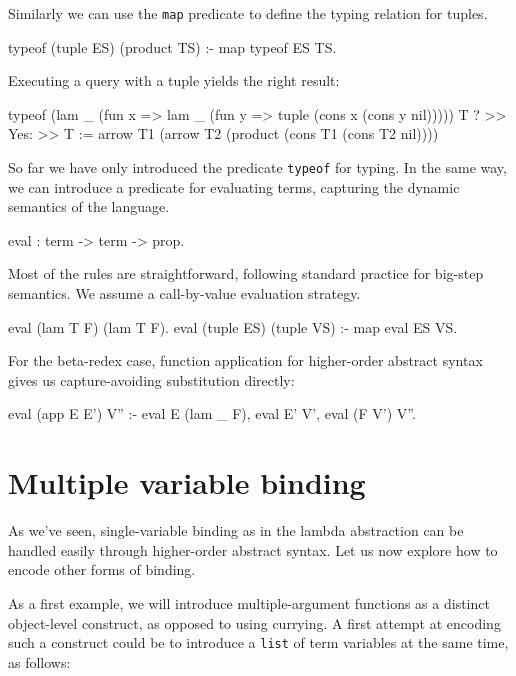 \documentclass[format=acmlarge,review,anonymous]{acmart}\settopmatter{printfolios=true}
\begin{document}
Similarly we can use the \texttt{map} predicate to define the typing relation for tuples. 

\begin{codequote}
typeof (tuple ES) (product TS) :-
  map typeof ES TS.
\end{codequote}

Executing a query with a tuple yields the right result:

\begin{codequote}
typeof (lam _ (fun x => lam _ (fun y => tuple (cons x (cons y nil))))) T ?
>> Yes:
>> T := arrow T1 (arrow T2 (product (cons T1 (cons T2 nil))))
\end{codequote}

So far we have only introduced the predicate \texttt{typeof} for typing. In the same way, we can introduce
a predicate for evaluating terms, capturing the dynamic semantics of the language.

\begin{codequote}
eval : term -> term -> prop.
\end{codequote}

Most of the rules are straightforward, following standard practice for big-step semantics.  We
assume a call-by-value evaluation strategy.

\begin{codequote}
eval (lam T F) (lam T F).
eval (tuple ES) (tuple VS) :- map eval ES VS.
\end{codequote}

For the beta-redex case, function application for higher-order abstract syntax gives us
capture-avoiding substitution directly:

\begin{codequote}
eval (app E E') V'' :-
  eval E (lam _ F), eval E' V', eval (F V') V''.
\end{codequote}


\section{Multiple variable binding}

As we've seen, single-variable binding as in the lambda abstraction can
be handled easily through higher-order abstract syntax. Let us now
explore how to encode other forms of binding.

As a first example, we will introduce multiple-argument functions as a
distinct object-level construct, as opposed to using currying. A first
attempt at encoding such a construct could be to introduce a
\texttt{list} of term variables at the same time, as follows:
\end{document}
